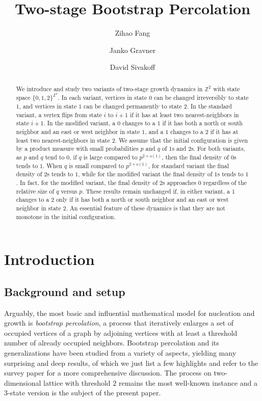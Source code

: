 \documentclass{article}
\title{Two-stage Bootstrap Percolation}
\author[1]{Zihao Fang}
\author[2]{Janko Gravner}
\author[3]{David Sivakoff}
\affil[1]{Department of Mathematics, The Ohio State University, {\tt fang.735@osu.edu}}
\affil[2]{Department of Mathematics, University of California, Davis, 
{\tt gravner@math.ucdavis.edu}}
\affil[3]{Departments of Statistics and Mathematics, The Ohio State University, {\tt dsivakoff@stat.osu.edu}}
\newcommand{\bZ}{{\mathbb Z}}
\numberwithin{equation}{section}
\begin{document}
\maketitle

\begin{abstract}
We introduce and study two variants of two-stage growth dynamics in $\bZ^2$ with state space $\{0,1,2\}^{\bZ^2}$. 
In each variant, vertices in state $0$ can be changed irreversibly to state $1$, and vertices in state $1$ can be changed permanently to state $2$. In the standard variant, a vertex flips from state $i$ to $i+1$ if it has at least two nearest-neighbors in state $i+1$. In the modified variant, a $0$ changes to a $1$ if it has both a north or south neighbor and an east or west neighbor in state $1$, and a $1$ changes to a $2$ if it has at least two nearest-neighbors in state $2$. We assume that the initial configuration  is given by a product measure with small probabilities $p$ and $q$ of $1$s and $2$s. For both variants, as $p$ and $q$ tend to $0$, if $q$ is large compared to $p^{2+o(1)}$, then the final density of $0$s tends to $1$. When $q$ is small compared to $p^{2+o(1)}$, for standard variant the final density of $2$s tends to $1$, while for the modified variant the final density of $1$s tends to $1$. In fact, for the modified variant, the final density of $2$s approaches $0$ regardless of the relative size of $q$ versus $p$. These results remain unchanged if, in either variant, a $1$ changes to a $2$ only if it has both a north or south neighbor and an east or west neighbor in state $2$.
An essential feature of these dynamics is that they 
are not monotone in the initial configuration.
\end{abstract}


\section{Introduction}

\subsection{Background and setup}
Arguably, 
the most basic and influential mathematical model for nucleation and growth is {\it bootstrap percolation\/}, a process that iteratively enlarges a set of
occupied vertices 
of a graph by adjoining vertices with at least a threshold number 
of already occupied neighbors. Bootstrap 
percolation and its generalizations have been studied from
a variety of aspects, yielding many surprising and deep results, of which we just list a few highlights \cite{AizenmanLebowitz, Holroyd2003,  Balogh2012, Bollobs2022, BBMS2022, BBMS22} and refer to the survey paper \cite{Morris2017} for a more comprehensive discussion. The process on
two-dimensional lattice 
with threshold $2$ remains the most well-known instance and a 3-state version is the subject of
the present paper.
\end{document}
